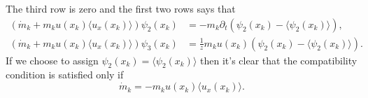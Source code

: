 \documentclass[english,master]{liumaiex}
\theoremstyle{plain}
\theoremstyle{definition}
\begin{document}
The third row is zero and the first two rows says that
\begin{equation}
\begin{aligned}
	(\dot{m}_k + m_ku(x_k) \langle u_x(x_k) \rangle) \psi_2(x_k) &= -m_k \partial_t (\psi_2(x_k) - \langle \psi_2(x_k) \rangle), \\
	(\dot{m}_k + m_ku(x_k) \langle u_x(x_k) \rangle) \psi_3(x_k) &= \frac{1}{z}m_k u(x_k) (\psi_2(x_k) - \langle \psi_2(x_k) \rangle).
\end{aligned}
\end{equation}
If we choose to assign $\psi_2(x_k) = \langle \psi_2(x_k) \rangle$ then it's clear that the compatibility condition is satisfied only if
\begin{equation}
	\dot{m}_k = -m_k u(x_k) \langle u_x(x_k) \rangle.
\end{equation}

%
%
\newpage


\end{document}
